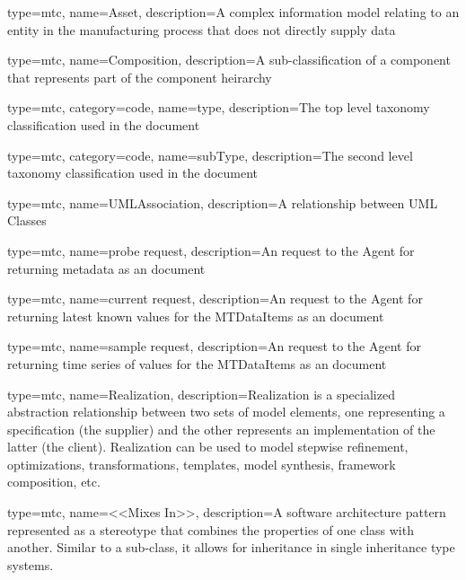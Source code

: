 {
  type=mtc,
  name=Asset,
  description={A complex information model relating to an entity in the manufacturing process that does not directly supply data}
}

{
  type=mtc,
  name=Composition,
  description={A sub-classification of a component that represents part of the component heirarchy}
}

{
  type=mtc,
  category=code,
  name=type,
  description={The top level taxonomy classification used in the  document}
}

{
  type=mtc,
  category=code,
  name=subType,
  description={The second level taxonomy classification used in the  document}
}

{
  type=mtc,
  name=UMLAssociation,
  description={A relationship between UML Classes}
}

{
  type=mtc,
  name={probe request},
  description={An  request to the \gls{Agent} for returning metadata as an   document}
}

{
  type=mtc,
  name={current request},
  description={An  request to the \gls{Agent} for returning latest known values for the \glspl{MTDataItem} as an   document}
}

{
  type=mtc,
  name={sample request},
  description={An  request to the \gls{Agent} for returning time series of values for the \glspl{MTDataItem} as an   document}
}

{
  type=mtc,
  name=Realization,
  description={Realization is a specialized abstraction relationship between two sets of model elements, one representing a specification (the supplier) and the other represents an implementation of the latter (the client). Realization can be used to model stepwise refinement, optimizations, transformations, templates, model synthesis, framework composition, etc.}
}

{
  type=mtc,
  name={<<Mixes In>>},
  description={A software architecture pattern represented as a \gls{stereotype} that combines the properties of one class with another. Similar to a sub-class, it allows for inheritance in single inheritance type systems.}
}

